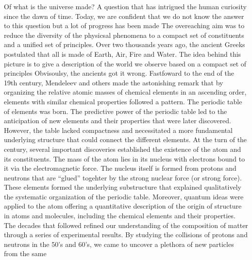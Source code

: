 

Of what is the universe made? A question that has intrigued the human curiosity since the dawn of time. 
Today, we are confident that we do not know the answer to this question but a lot of progress has been made
The overeaching aim was to reduce the diversity of the physicsal phenomena to a compact set of constituents
and a unified set of principles.
Over two thousands years ago, the ancient Greeks  postulated that all is made of Earth, Air, Fire and Water. 
The idea behind this picture is to give a description of the world we observe based on a compact set of principles 
Obvisoulsy, the ancients got it wrong.
Fastfoward to the end of the 19th century, Mendeleev and others made the astonishing remark that by organizing the 
relative atomic masses of chemical elements in an ascending order, elements with similar chemical properties followed a pattern.
The periodic table of elements was born. 
The predictive power of the periodic table led to the anticipation of new elements and their properties that were later discovered.
However, the table lacked compactness and necessitated a more fundamental underlying structure that could 
connect the different elements. At the turn of the century, several important discoveries established 
the existence of the atom and its constituents. The mass of the atom lies in its nucleus with electrons bound to it via the 
electromagnetic force. The nucleus itself is formed from 
protons and neutrons that are ``glued'' togehter by the strong nuclear force (or strong force).
These elements formed the underlying substructure that explained qualitatively the systematic organization of the periodic table.
Moreover, quantum ideas were applied to the atom offering a quantitative description of the origin of structure in atoms and molecules, 
including the chemical elements and their properties.
The decades that followed refined our understanding of the composition of matter through a series of experimental results.
By studying the collisions of protons and neutrons in the 50's and 60's, we came to uncover a plethora of new particles from the same 
